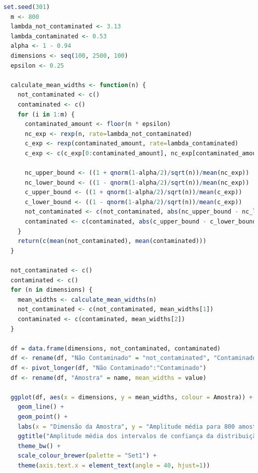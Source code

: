 \documentclass[10pt]{article}
\begin{document}
\begin{lstlisting}[language=R]
  set.seed(301)
  m <- 800
  lambda_not_contaminated <- 3.13
  lambda_contaminated <- 0.53
  alpha <- 1 - 0.94
  dimensions <- seq(100, 2500, 100)
  epsilon <- 0.25

  calculate_mean_widths <- function(n) {
    not_contaminated <- c()
    contaminated <- c()
    for (i in 1:m) {
      contaminated_amount <- floor(n * epsilon)
      nc_exp <- rexp(n, rate=lambda_not_contaminated)
      c_exp <- rexp(contaminated_amount, rate=lambda_contaminated)
      c_exp <- c(c_exp[0:contaminated_amount], nc_exp[contaminated_amount:n])

      nc_upper_bound <- ((1 + qnorm(1-alpha/2)/sqrt(n))/mean(nc_exp))
      nc_lower_bound <- ((1 - qnorm(1-alpha/2)/sqrt(n))/mean(nc_exp))
      c_upper_bound <- ((1 + qnorm(1-alpha/2)/sqrt(n))/mean(c_exp))
      c_lower_bound <- ((1 - qnorm(1-alpha/2)/sqrt(n))/mean(c_exp))
      not_contaminated <- c(not_contaminated, abs(nc_upper_bound - nc_lower_bound))
      contaminated <- c(contaminated, abs(c_upper_bound - c_lower_bound))
    }
    return(c(mean(not_contaminated), mean(contaminated)))
  }

  not_contaminated <- c()
  contaminated <- c()
  for (n in dimensions) {
    mean_widths <- calculate_mean_widths(n)
    not_contaminated <- c(not_contaminated, mean_widths[1])
    contaminated <- c(contaminated, mean_widths[2])
  }

  df = data.frame(dimensions, not_contaminated, contaminated)
  df <- rename(df, "Não Contaminado" = "not_contaminated", "Contaminado" = "contaminated")
  df <- pivot_longer(df, "Não Contaminado":"Contaminado")
  df <- rename(df, "Amostra" = name, mean_widths = value)

  ggplot(df, aes(x = dimensions, y = mean_widths, colour = Amostra)) +
    geom_line() +
    geom_point() +
    labs(x = "Dimensão da Amostra", y = "Amplitude média para 800 amostras") +
    ggtitle("Amplitude média dos intervalos de confiança da distribuição exponencial") +
    theme_bw() +
    scale_colour_brewer(palette = "Set1") +
    theme(axis.text.x = element_text(angle = 40, hjust=1))
\end{lstlisting}
\end{document}

